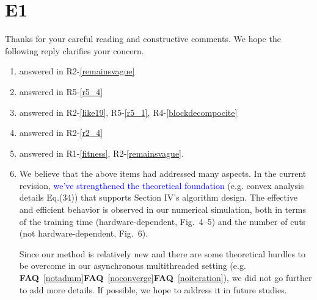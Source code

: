 \documentclass[11pt]{article}
\newcommand{\faq}[1]{\textbf{FAQ}~\ref{#1}}
\newcommand{\blue}[1]{\textcolor{blue}{#1}}
\begin{document}
\section{E1} \label{e1ans}
Thanks for your careful reading and constructive comments. We hope the following reply clarifies your concern.
\begin{enumerate}
    \item answered in R2-\ref{remainsvague}
    \item answered in R5-\ref{r5_4}
    \item answered in R2-\ref{like19}, R5-\ref{r5_1}, R4-\ref{blockdecompocite}
    \item answered in R2-\ref{r2_4}
    \item answered in R1-\ref{fitness}, R2-\ref{remainsvague}.
    \item We believe that the above items had addressed many aspects.
    In the current revision, \blue{we've strengthened the theoretical foundation} (e.g. convex analysis details Eq.(34)) that supports Section IV's algorithm design.
    The effective and efficient behavior is observed in our numerical simulation, both in terms of the training time (hardware-dependent, Fig.~4--5) and the number of cuts (not hardware-dependent, Fig.~6).
    \par
    Since our method is relatively new and there are some theoretical hurdles to be overcome in our asynchronous multithreaded setting (e.g. \faq{notadmm}\faq{noconverge}\faq{noiteration}), we did not go further to add more details.
    If possible, we hope to address it in future studies.
\end{enumerate}
\end{document}
